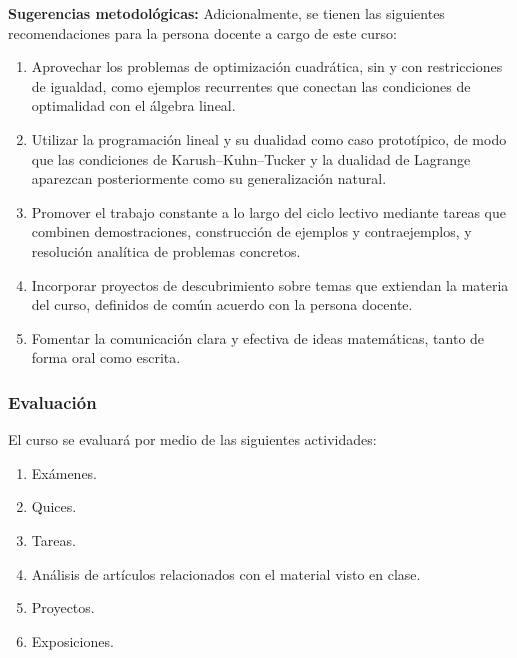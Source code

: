 \begin{refsection}
\textbf{Sugerencias metodológicas:} Adicionalmente, se tienen las siguientes recomendaciones para la persona docente a cargo de este curso:
\begin{enumerate}
    \item Aprovechar los problemas de optimización cuadrática, sin y con restricciones de igualdad, como ejemplos recurrentes que conectan las condiciones de optimalidad con el álgebra lineal.
    \item Utilizar la programación lineal y su dualidad como caso prototípico, de modo que las condiciones de Karush--Kuhn--Tucker y la dualidad de Lagrange aparezcan posteriormente como su generalización natural.
    \item Promover el trabajo constante a lo largo del ciclo lectivo mediante tareas que combinen demostraciones, construcción de ejemplos y contraejemplos, y resolución analítica de problemas concretos.
    \item Incorporar proyectos de descubrimiento sobre temas que extiendan la materia del curso, definidos de común acuerdo con la persona docente.
    \item Fomentar la comunicación clara y efectiva de ideas matemáticas, tanto de forma oral como escrita.
\end{enumerate}

\subsubsection*{Evaluación}

El curso se evaluará por medio de las siguientes actividades:

\begin{enumerate}
\item Exámenes.
\item Quices.
\item Tareas.
\item Análisis de artículos relacionados con el material visto en clase.
\item Proyectos.
\item Exposiciones.
\end{enumerate}

\nocite{Sun96}
\nocite{LY16}
\nocite{BT97}
\nocite{BV04}
\nocite{Rus06}
\nocite{Ber16}

\printcursosbibliography
\end{refsection}
